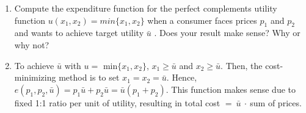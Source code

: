\documentclass{article}
\begin{document}
\begin{enumerate}
\begin{enumerate}[label=(\alph*)]
\end{enumerate}
\item Compute the expenditure function for the perfect complements utility function $u(x_1, x_2) = min\{x_1, x_2\}$ when a consumer faces prices $p_1$ and $p_2$ and wants to achieve target utility $\bar{u}$ . Does your result make sense? Why or why not?
\item[] To achieve $\bar u$ with $u=$ min$\{x_1,x_2\}$, $x_1\geq \bar u$ and $x_2\geq \bar u$. Then, the cost-minimizing method is to set $x_1=x_2=\bar u$. Hence, $e(p_1,p_2,\bar u)=p_1\bar u +p_2\bar u=\bar u(p_1+p_2)$. This function makes sense due to fixed 1:1 ratio per unit of utility, resulting in total cost $=\ \bar u \ \cdot \ $sum of prices.
 \end{enumerate}
\end{document}
